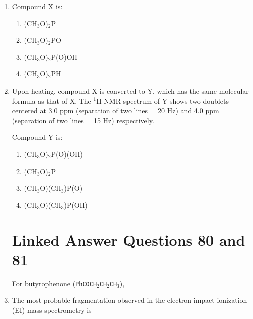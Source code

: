 \documentclass[12pt]{article}
\begin{document}
\begin{enumerate}
    \item Compound X is:
    \begin{enumerate}
        \item (CH$_3$O)$_2$P
        \item (CH$_3$O)$_2$PO
        \item (CH$_3$O)$_2$P(O)OH
        \item (CH$_3$O)$_2$PH
    \end{enumerate}    \hfill{}


    \item Upon heating, compound X is converted to Y, which has the same molecular formula as that of X. The $^1$H NMR spectrum of Y shows two doublets centered at 3.0 ppm (separation of two lines = 20 Hz) and 4.0 ppm (separation of two lines = 15 Hz) respectively.

    Compound Y is:
    \begin{enumerate}
        \item (CH$_3$O)$_2$P(O)(OH)
        \item (CH$_3$O)$_2$P
        \item (CH$_3$O)(CH$_3$)P(O)
        \item (CH$_3$O)(CH$_3$)P(OH)
    \end{enumerate}
   \hfill{}


\section*{Linked Answer Questions 80 and 81}

For butyrophenone (\texttt{PhCOCH\(_2\)CH\(_2\)CH\(_3\)}),

\item  The most probable fragmentation observed in the electron impact ionization (EI) mass spectrometry is


\end{enumerate}
\end{document}
